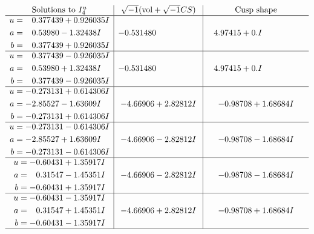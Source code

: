 \documentclass[1p]{elsarticle_modified}
\theoremstyle{definition}
\newcommand{\I}{\sqrt{-1}}
\begin{document}
$$\begin{array}{c|c|c}  
\text{Solutions to }I^u_{4}& \I (\text{vol} + \sqrt{-1}CS) & \text{Cusp shape}\\
 \hline 
\begin{aligned}
u &= \phantom{-}0.377439 + 0.926035 I \\
a &= \phantom{-}0.53980 - 1.32438 I \\
b &= \phantom{-}0.377439 + 0.926035 I\end{aligned}
 & -0.531480\phantom{ +0.000000I} & \phantom{-}4.97415 + 0. I\phantom{ +0.000000I} \\ \hline\begin{aligned}
u &= \phantom{-}0.377439 - 0.926035 I \\
a &= \phantom{-}0.53980 + 1.32438 I \\
b &= \phantom{-}0.377439 - 0.926035 I\end{aligned}
 & -0.531480\phantom{ +0.000000I} & \phantom{-}4.97415 + 0. I\phantom{ +0.000000I} \\ \hline\begin{aligned}
u &= -0.273131 + 0.614306 I \\
a &= -2.85527 - 1.63609 I \\
b &= -0.273131 + 0.614306 I\end{aligned}
 & -4.66906 + 2.82812 I & -0.98708 + 1.68684 I \\ \hline\begin{aligned}
u &= -0.273131 - 0.614306 I \\
a &= -2.85527 + 1.63609 I \\
b &= -0.273131 - 0.614306 I\end{aligned}
 & -4.66906 - 2.82812 I & -0.98708 - 1.68684 I \\ \hline\begin{aligned}
u &= -0.60431 + 1.35917 I \\
a &= \phantom{-}0.31547 - 1.45351 I \\
b &= -0.60431 + 1.35917 I\end{aligned}
 & -4.66906 - 2.82812 I & -0.98708 - 1.68684 I \\ \hline\begin{aligned}
u &= -0.60431 - 1.35917 I \\
a &= \phantom{-}0.31547 + 1.45351 I \\
b &= -0.60431 - 1.35917 I\end{aligned}
 & -4.66906 + 2.82812 I & -0.98708 + 1.68684 I\\
 \hline 
 \end{array}$$\newpage
\end{document}
